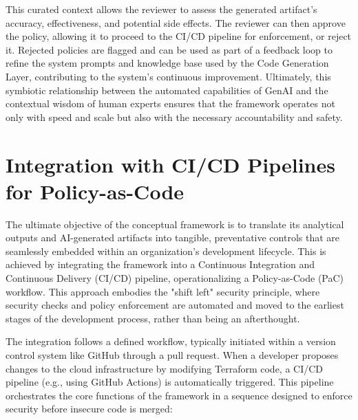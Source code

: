 This curated context allows the reviewer to assess the generated artifact's accuracy, effectiveness, and potential side effects. The reviewer can then approve the policy, allowing it to proceed to the CI/CD pipeline for enforcement, or reject it. Rejected policies are flagged and can be used as part of a feedback loop to refine the system prompts and knowledge base used by the Code Generation Layer, contributing to the system's continuous improvement\cite{zanzotto_human---loop_2019, wu_survey_2022}. Ultimately, this symbiotic relationship between the automated capabilities of GenAI and the contextual wisdom of human experts ensures that the framework operates not only with speed and scale but also with the necessary accountability and safety.


\section{Integration with CI/CD Pipelines for Policy-as-Code} %
\label{sec:Integration with CI/CD Pipelines for Policy-as-Code}

The ultimate objective of the conceptual framework is to translate its analytical outputs and AI-generated artifacts into tangible, preventative controls that are seamlessly embedded within an organization's development lifecycle. This is achieved by integrating the framework into a Continuous Integration and Continuous Delivery (CI/CD) pipeline, operationalizing a Policy-as-Code (PaC) workflow. This approach embodies the "shift left" security principle, where security checks and policy enforcement are automated and moved to the earliest stages of the development process, rather than being an afterthought.

The integration follows a defined workflow, typically initiated within a version control system like GitHub through a pull request. When a developer proposes changes to the cloud infrastructure by modifying Terraform code, a CI/CD pipeline (e.g., using GitHub Actions) is automatically triggered. This pipeline orchestrates the core functions of the framework in a sequence designed to enforce security before insecure code is merged:

